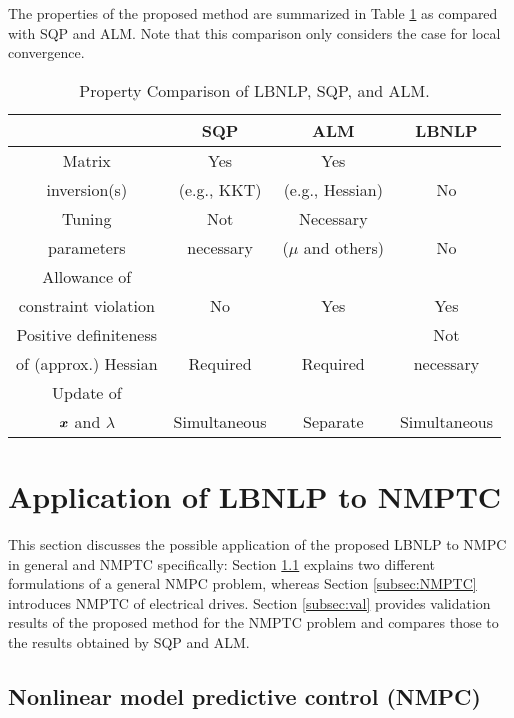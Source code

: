 \documentclass[journal]{IEEEtranTIE}
\begin{document}
The properties of the proposed method are summarized in Table \ref{tab:Comparison of LBNLP, SQP and ALM} as compared with SQP and ALM. Note that this comparison only considers the case for local convergence.

\begin{table}[!t]
\caption{Property Comparison of LBNLP, SQP, and ALM.}
\label{tab:Comparison of LBNLP, SQP and ALM}
\centering
{\begin{tabular}{cccc}\hline
  & SQP & ALM & LBNLP \\
\hline\hline
\rowcolor{lightgray} 
Matrix  & Yes & Yes & \\
\rowcolor{lightgray}
inversion(s) & (e.g., KKT) & (e.g., Hessian) & \multirow{-2}{*}{No}\\
Tuning & Not & Necessary & \\
parameters & necessary & ($\mu$ and others) & \multirow{-2}{*}{No}\\
\rowcolor{lightgray}
Allowance of &  &  & \\
\rowcolor{lightgray}
constraint violation & \multirow{-2}{*}{No} & \multirow{-2}{*}{Yes} & \multirow{-2}{*}{Yes}\\
Positive definiteness &  &  & Not \\
of (approx.) Hessian & \multirow{-2}{*}{Required} & \multirow{-2}{*}{Required} & necessary\\
\rowcolor{lightgray}
Update of & & &\\
\rowcolor{lightgray}
$\boldsymbol{x}$ and $\lambda$  & \multirow{-2}{*}{Simultaneous} & \multirow{-2}{*}{Separate} & \multirow{-2}{*}{Simultaneous}\\
\hline
\end{tabular}}
\end{table}

\section{Application of LBNLP to NMPTC}
\label{sec:Application to NMPTC}

This section discusses the possible application of the proposed LBNLP to NMPC in general and NMPTC specifically: Section \ref{subsec:NMPC} explains two different formulations of a general NMPC problem,  whereas Section \ref{subsec:NMPTC} introduces NMPTC of electrical drives. Section \ref{subsec:val} provides validation results of the proposed method for the NMPTC problem and compares those to the results obtained by SQP and ALM.

\subsection{Nonlinear model predictive control (NMPC)}
\label{subsec:NMPC}
\end{document}
